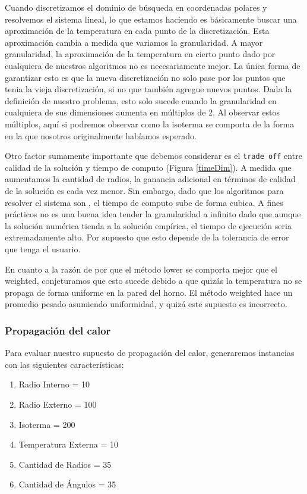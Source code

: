 Cuando discretizamos el dominio de búsqueda en coordenadas polares y resolvemos el sistema lineal, lo que estamos haciendo es básicamente buscar una aproximación de la temperatura en cada punto de la discretización. Esta aproximación cambia a medida que variamos la granularidad. A mayor granularidad, la aproximación de la temperatura en cierto punto dado por cualquiera de nuestros algoritmos no es necesariamente mejor. La única forma de garantizar esto es que la nueva discretización no solo pase por los puntos que tenia la vieja discretización, si no que también agregue nuevos puntos. Dada la definición de nuestro problema, esto solo sucede cuando la granularidad en cualquiera de sus dimensiones aumenta en múltiplos de 2. Al observar estos múltiplos, aquí si podremos observar como la isoterma se comporta de la forma en la que nosotros originalmente habíamos esperado.

Otro factor sumamente importante que debemos considerar es el \texttt{trade off} entre calidad de la solución y tiempo de computo (Figura \ref{timeDim}). A medida que aumentamos la cantidad de radios, la ganancia adicional en términos de calidad de la solución es cada vez menor. Sin embargo, dado que los algoritmos para resolver el sistema son , el tiempo de computo sube de forma cubica. A fines prácticos no es una buena idea tender la granularidad a infinito dado que aunque la solución numérica tienda a la solución empírica, el tiempo de ejecución seria extremadamente alto. Por supuesto que esto depende de la tolerancia de error que tenga el usuario.

En cuanto a la razón de por que el método lower se comporta mejor que el weighted, conjeturamos que esto sucede debido a que quizás la temperatura no se propaga de forma uniforme en la pared del horno. El método weighted hace un promedio pesado asumiendo uniformidad, y quizá este supuesto es incorrecto.

\pagebreak

\subsubsection{Propagación del calor}

Para evaluar nuestro supuesto de propagación del calor, generaremos instancias con las siguientes características:

\begin{enumerate}
\item Radio Interno = 10
\item Radio Externo = 100
\item Isoterma = 200
\item Temperatura Externa = 10
\item Cantidad de Radios = 35
\item Cantidad de Ángulos = 35
\end{enumerate}

